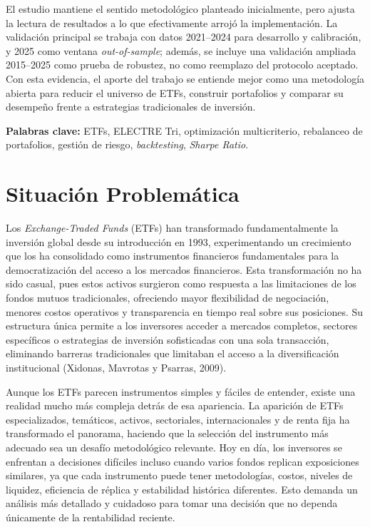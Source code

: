 \documentclass[12pt,letterpaper]{article}
\begin{document}
\begin{titlepage}
El estudio mantiene el sentido metodológico planteado inicialmente, pero ajusta la lectura de resultados a lo que efectivamente arrojó la implementación. La validación principal se trabaja con datos 2021--2024 para desarrollo y calibración, y 2025 como ventana \textit{out-of-sample}; además, se incluye una validación ampliada 2015--2025 como prueba de robustez, no como reemplazo del protocolo aceptado. Con esta evidencia, el aporte del trabajo se entiende mejor como una metodología abierta para reducir el universo de ETFs, construir portafolios y comparar su desempeño frente a estrategias tradicionales de inversión.

\textbf{Palabras clave:} ETFs, ELECTRE Tri, optimización multicriterio, rebalanceo de portafolios, gestión de riesgo, \textit{backtesting}, \textit{Sharpe Ratio}.
\end{titlepage}

\tableofcontents
\newpage
\renewcommand{\listfigurename}{Lista de figuras}
\renewcommand{\listtablename}{Lista de tablas}
\listoffigures
\listoftables
\newpage

\clearpage
\section{Situación Problemática}

Los \textit{Exchange-Traded Funds} (ETFs) han transformado fundamentalmente la inversión global desde su introducción en 1993, experimentando un crecimiento que los ha consolidado como instrumentos financieros fundamentales para la democratización del acceso a los mercados financieros. Esta transformación no ha sido casual, pues estos activos surgieron como respuesta a las limitaciones de los fondos mutuos tradicionales, ofreciendo mayor flexibilidad de negociación, menores costos operativos y transparencia en tiempo real sobre sus posiciones. Su estructura única permite a los inversores acceder a mercados completos, sectores específicos o estrategias de inversión sofisticadas con una sola transacción, eliminando barreras tradicionales que limitaban el acceso a la diversificación institucional (Xidonas, Mavrotas y Psarras, 2009).

Aunque los ETFs parecen instrumentos simples y fáciles de entender, existe una realidad mucho más compleja detrás de esa apariencia. La aparición de ETFs especializados, temáticos, activos, sectoriales, internacionales y de renta fija ha transformado el panorama, haciendo que la selección del instrumento más adecuado sea un desafío metodológico relevante. Hoy en día, los inversores se enfrentan a decisiones difíciles incluso cuando varios fondos replican exposiciones similares, ya que cada instrumento puede tener metodologías, costos, niveles de liquidez, eficiencia de réplica y estabilidad histórica diferentes. Esto demanda un análisis más detallado y cuidadoso para tomar una decisión que no dependa únicamente de la rentabilidad reciente.
\end{document}
